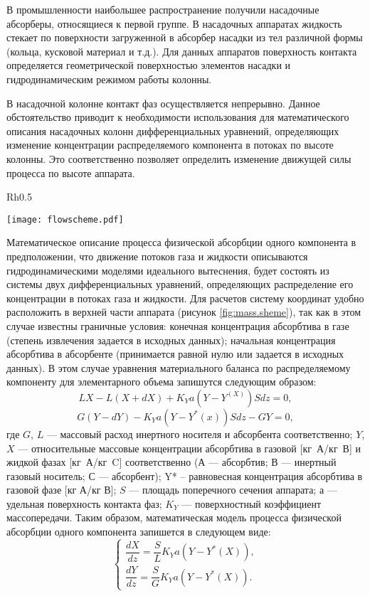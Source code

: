 В промышленности наибольшее распространение получили насадочные абсорберы, относящиеся к первой группе. В насадочных аппаратах жидкость стекает по поверхности загруженной в абсорбер насадки из тел различной формы (кольца, кусковой материал и т.д.). Для данных аппаратов поверхность контакта определяется геометрической поверхностью элементов насадки и гидродинамическим режимом работы колонны.

В насадочной колонне контакт фаз осуществляется непрерывно. Данное обстоятельство приводит к необходимости использования для математического описания насадочных колонн дифференциальных уравнений, определяющих изменение концентрации распределяемого компонента в потоках по высоте колонны. Это соответственно позволяет определить изменение движущей силы процесса по высоте аппарата.
\begin{wrapfigure}{Rh}{0.5\textwidth}
	\begin{center}
		\texttt{[image: flowscheme.pdf]}
	\end{center}
	\caption{ Схема проведения процесса абсорбции (противоточная)} \label{fig:mass.sheme}
\end{wrapfigure}

Математическое описание процесса физической абсорбции одного компонента в предположении, что движение потоков газа и жидкости описываются гидродинамическими моделями идеального вытеснения, будет состоять из системы двух дифференциальных уравнений, определяющих распределение его концентрации в потоках газа и жидкости. Для расчетов систему координат удобно расположить в верхней части аппарата (рисунок \ref{fig:mass.sheme}), так как в этом случае известны граничные условия: конечная концентрация абсорбтива в газе (степень извлечения задается в исходных данных); начальная концентрация абсорбтива в абсорбенте (принимается равной нулю или задается в исходных данных). В этом случае уравнения материального баланса по распределяемому компоненту для элементарного объема  запишутся следующим образом:
\begin{equation}
	L X - L(X +dX) + K_Y a (Y-Y^(X))Sdz=0, 
\end{equation}
\begin{equation}
	G(Y-dY)-K_Y a (Y-Y^*(x))Sdz- GY=0,
\end{equation}
где $G$, $L$ --- массовый расход инертного носителя и абсорбента соответственно; $Y$, $X$ --- относительные массовые концентрации абсорбтива в газовой [кг А/кг В] и жидкой фазах [кг А/кг C] соответственно (А --- абсорбтив; В --- инертный газовый носитель; С --- абсорбент); Y* – равновесная концентрация абсорбтива в газовой фазе [кг А/кг В]; $S$ --- площадь поперечного сечения аппарата; $а$ --- удельная поверхность контакта фаз; $K_Y$ --- поверхностный коэффициент массопередачи. Таким образом, математическая модель процесса физической абсорбции одного компонента запишется в следующем виде:
\begin{equation}
\left\lbrace 
\begin{gathered} 
\dfrac{dX}{dz}=\dfrac{S}{L} K_Y a (Y-Y^*(X)),
\\
\dfrac{dY}{dz}=\dfrac{S}{G} K_Y a (Y-Y^*(X)).
\end{gathered} 
\right.
\end{equation}

